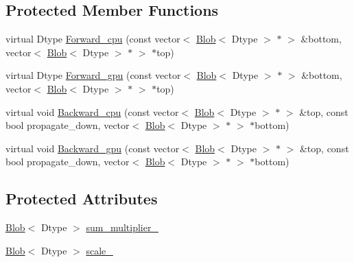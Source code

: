 \subsection*{Protected Member Functions}
\begin{DoxyCompactItemize}
\item 
virtual Dtype \hyperlink{classcaffe_1_1_softmax_layer_a11afab015d5240699e45c44b5c4b64ff}{Forward\+\_\+cpu} (const vector$<$ \hyperlink{classcaffe_1_1_blob}{Blob}$<$ Dtype $>$ $\ast$ $>$ \&bottom, vector$<$ \hyperlink{classcaffe_1_1_blob}{Blob}$<$ Dtype $>$ $\ast$ $>$ $\ast$top)
\item 
virtual Dtype \hyperlink{classcaffe_1_1_softmax_layer_a37ede6eb847d766731b833e2f8923219}{Forward\+\_\+gpu} (const vector$<$ \hyperlink{classcaffe_1_1_blob}{Blob}$<$ Dtype $>$ $\ast$ $>$ \&bottom, vector$<$ \hyperlink{classcaffe_1_1_blob}{Blob}$<$ Dtype $>$ $\ast$ $>$ $\ast$top)
\item 
virtual void \hyperlink{classcaffe_1_1_softmax_layer_a2f318816073f4585d6b84168fd2ce418}{Backward\+\_\+cpu} (const vector$<$ \hyperlink{classcaffe_1_1_blob}{Blob}$<$ Dtype $>$ $\ast$ $>$ \&top, const bool propagate\+\_\+down, vector$<$ \hyperlink{classcaffe_1_1_blob}{Blob}$<$ Dtype $>$ $\ast$ $>$ $\ast$bottom)
\item 
virtual void \hyperlink{classcaffe_1_1_softmax_layer_a46febb93e499d1fccd68f406a3dd4bcb}{Backward\+\_\+gpu} (const vector$<$ \hyperlink{classcaffe_1_1_blob}{Blob}$<$ Dtype $>$ $\ast$ $>$ \&top, const bool propagate\+\_\+down, vector$<$ \hyperlink{classcaffe_1_1_blob}{Blob}$<$ Dtype $>$ $\ast$ $>$ $\ast$bottom)
\end{DoxyCompactItemize}
\subsection*{Protected Attributes}
\begin{DoxyCompactItemize}
\item 
\hyperlink{classcaffe_1_1_blob}{Blob}$<$ Dtype $>$ \hyperlink{classcaffe_1_1_softmax_layer_a3bfc4000b464ab32c73060a2d5c4e426}{sum\+\_\+multiplier\+\_\+}
\item 
\hyperlink{classcaffe_1_1_blob}{Blob}$<$ Dtype $>$ \hyperlink{classcaffe_1_1_softmax_layer_a22a5348d7a31c512ac9d5dcfc066d4b1}{scale\+\_\+}
\end{DoxyCompactItemize}


